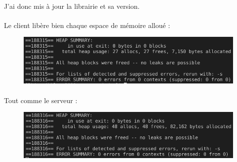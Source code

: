 \documentclass{article}
\begin{document}
    \paragraph{}
    J'ai donc mis à jour la librairie et sa version.

    \paragraph{}
    Le client libère bien chaque espace de mémoire alloué :
    \begin{figure}[H]
        \centering
        \includegraphics[width=.7\textwidth]{./screenshots/test-valgrind-client.png}
    \end{figure}

    \paragraph{}
    Tout comme le serveur :
    \begin{figure}[H]
        \centering
        \includegraphics[width=.7\textwidth]{./screenshots/test-valgrind-server.png}
    \end{figure}
\end{document}
